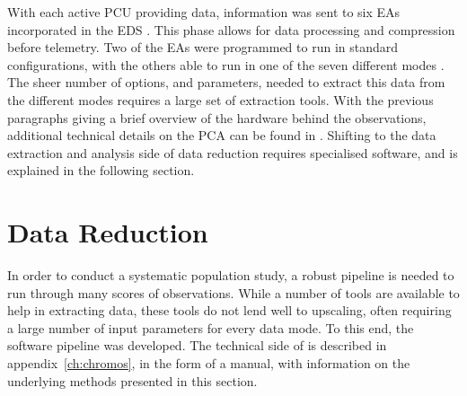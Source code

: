 With each active \ac{PCU} providing data, information was sent to six \acp{EA} incorporated in the \ac{EDS} \citep{jahoda1996orbit}. This phase allows for data processing and compression before telemetry. Two of the \acp{EA} were programmed to run in standard configurations, with the others able to run in one of the seven different modes \citep{rxtepcaissues}. The sheer number of options, and parameters, needed to extract this data from the different modes requires a large set of extraction tools. With the previous paragraphs giving a brief overview of the hardware behind the observations, additional technical details on the \ac{PCA} can be found in \citet{zhang1993laboratory}. Shifting to the data extraction and analysis side of data reduction requires specialised software, and is explained in the following section.\\

\section{Data Reduction}
\label{sec:data_reduction}
In order to conduct a systematic population study, a robust pipeline is needed to run through many scores of observations. While a number of tools are available to help in extracting data, these tools do not lend well to upscaling, often requiring a large number of input parameters for every data mode. To this end, the \chromos software pipeline was developed. The technical side of \chromos is described in appendix~\ref{ch:chromos}, in the form of a manual, with information on the underlying methods presented in this section. \ \\

